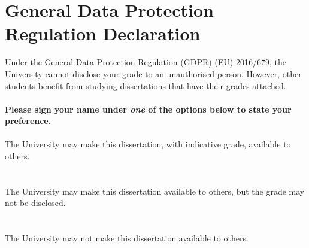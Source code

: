 \section*{General Data Protection Regulation Declaration}
Under the General Data Protection Regulation (GDPR) (EU) 2016/679, the University cannot disclose your grade to an unauthorised person. However, other students benefit from studying dissertations that have their grades attached.
\newline\\
\\
\textbf{Please sign your name under \textit{one} of the options below to state your preference.}
\newline\\
\\
The University may make this dissertation, with indicative grade, available to others.
\\
\newline
\\
\newline
\\
The University may make this dissertation available to others, but the grade may not be disclosed.
\\
\newline
\\
\newline
\\
\newline
The University may not make this dissertation available to others.




